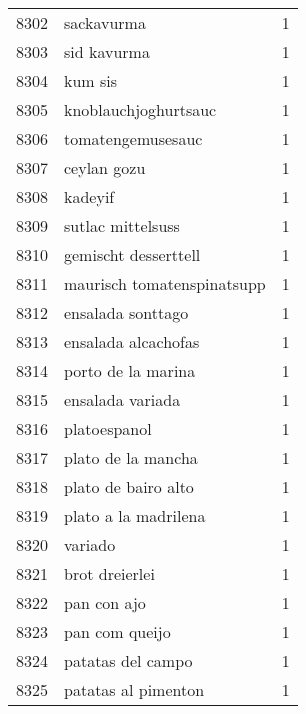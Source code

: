 \begin{tabular}{llr}
8302 &                                         sackavurma &      1 \\
8303 &                                        sid kavurma &      1 \\
8304 &                                            kum sis &      1 \\
8305 &                               knoblauchjoghurtsauc &      1 \\
8306 &                                  tomatengemusesauc &      1 \\
8307 &                                        ceylan gozu &      1 \\
8308 &                                            kadeyif &      1 \\
8309 &                                  sutlac mittelsuss &      1 \\
8310 &                               gemischt desserttell &      1 \\
8311 &                         maurisch tomatenspinatsupp &      1 \\
8312 &                                  ensalada sonttago &      1 \\
8313 &                                ensalada alcachofas &      1 \\
8314 &                                 porto de la marina &      1 \\
8315 &                                   ensalada variada &      1 \\
8316 &                                       platoespanol &      1 \\
8317 &                                 plato de la mancha &      1 \\
8318 &                                plato de bairo alto &      1 \\
8319 &                               plato a la madrilena &      1 \\
8320 &                                            variado &      1 \\
8321 &                                     brot dreierlei &      1 \\
8322 &                                        pan con ajo &      1 \\
8323 &                                     pan com queijo &      1 \\
8324 &                                  patatas del campo &      1 \\
8325 &                                patatas al pimenton &      1 \\

\end{tabular}

